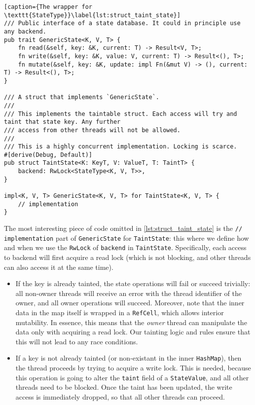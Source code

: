 \begin{lstlisting}[caption={The wrapper for \texttt{StateType}}\label{lst:struct_taint_state}]
/// Public interface of a state database. It could in principle use any backend.
pub trait GenericState<K, V, T> {
	fn read(&self, key: &K, current: T) -> Result<V, T>;
	fn write(&self, key: &K, value: V, current: T) -> Result<(), T>;
	fn mutate(&self, key: &K, update: impl Fn(&mut V) -> (), current: T) -> Result<(), T>;
}

/// A struct that implements `GenericState`.
///
/// This implements the taintable struct. Each access will try and taint that state key. Any further
/// access from other threads will not be allowed.
///
/// This is a highly concurrent implementation. Locking is scarce.
#[derive(Debug, Default)]
pub struct TaintState<K: KeyT, V: ValueT, T: TaintT> {
	backend: RwLock<StateType<K, V, T>>,
}

impl<K, V, T> GenericState<K, V, T> for TaintState<K, V, T> {
	// implementation
}
\end{lstlisting}

The most interesting piece of code omitted in \ref{lst:struct_taint_state} is the \texttt{//
implementation} part of \texttt{GenericState} for \texttt{TaintState}: this where we define how and
when we use the \texttt{RwLock} of \texttt{backend} in \texttt{TaintState}.
Specifically, each access to backend will first acquire a read lock (which is not blocking,
and other threads can also access it at the same time).

\begin{itemize}
	\item If the key is already tainted, the state operations will fail or succeed trivially: all
	non-owner threads will receive an error with the thread identifier of the owner, and  all owner
	operations will succeed. Moreover, note that the inner data in the map itself is wrapped in a
	\texttt{RefCell}, which allows interior mutability\cite{RefCellInteriorMutability}. In essence,
	this means that the \textit{owner} thread can manipulate the data only with acquiring a read lock.
	Our tainting logic and rules ensure that this will not lead to any race conditions.
	\item If a key is not already tainted (or non-existant in the inner \texttt{HashMap}), then the
	thread proceeds by trying to acquire a write lock. This is needed, because this operation is
	going to alter the \texttt{taint} field of a \texttt{StateValue}, and all other threads need to
	be blocked. Once the taint has been updated, the write access is immediately dropped, so that
	all other threads can proceed.
\end{itemize}

